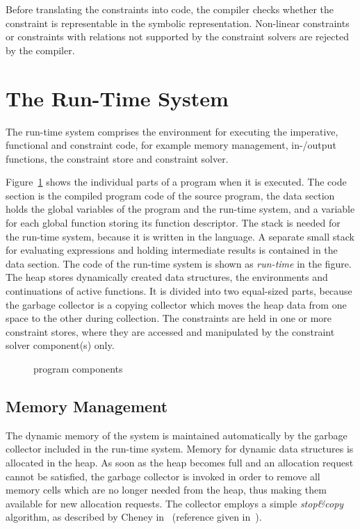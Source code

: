 Before translating the constraints into code, the compiler checks
whether the constraint is representable in the symbolic
representation.  Non-linear constraints or constraints with relations
not supported by the constraint solvers are rejected by the compiler.


\section{The Run-Time System}

The run-time system comprises the environment for executing the
imperative, functional and constraint code, for example memory
management, in-/output functions, the constraint store and constraint
solver.

Figure~\ref{pic:turtle-program-parts} shows the individual parts of a
\turtle{} program when it is executed.  The code section is the
compiled program code of the source program, the data section holds
the global variables of the \turtle{} program and the run-time system,
and a variable for each global function storing its function
descriptor.  The stack is needed for the run-time system, because it
is written in the \cee{} language.  A separate small stack for
evaluating expressions and holding intermediate results is contained
in the data section.  The code of the run-time system is shown as {\em
  \turtle{} run-time} in the figure.  The heap stores dynamically
created data structures, the environments and continuations of active
\turtle{} functions.  It is divided into two equal-sized parts,
because the garbage collector is a copying collector which moves the
heap data from one space to the other during collection.  The
constraints are held in one or more constraint stores, where they are
accessed and manipulated by the constraint solver component(s) only.

\begin{figure}[htp]
\begin{center}

\end{center}
\caption{\turtle{} program components}%
\label{pic:turtle-program-parts}
\end{figure}


\subsection{Memory Management}
\label{sec:memory-management}

%
The dynamic memory of the \turtle{} system is maintained automatically
by the garbage collector included in the run-time system.  Memory for
dynamic data structures is allocated in the heap.  As soon as the heap
becomes full and an allocation request cannot be satisfied, the
garbage collector is invoked in order to remove all memory cells which
are no longer needed from the heap, thus making them available for new
allocation requests.  The collector employs a simple {\em stop\&copy}
algorithm, as described by Cheney in~\cite{cheney70compaction}
(reference given in~\cite{jones96gc}).


